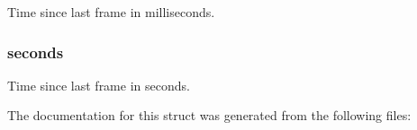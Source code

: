 Time since last frame in milliseconds. \mbox{\label{structgaixw__context_8frametime_a783e8e29e6a8c3e22baa58a19420eb4f}} 
\subsubsection{\texorpdfstring{seconds}{seconds}}
{\footnotesize\ttfamily }

Time since last frame in seconds. 

The documentation for this struct was generated from the following files\+:
